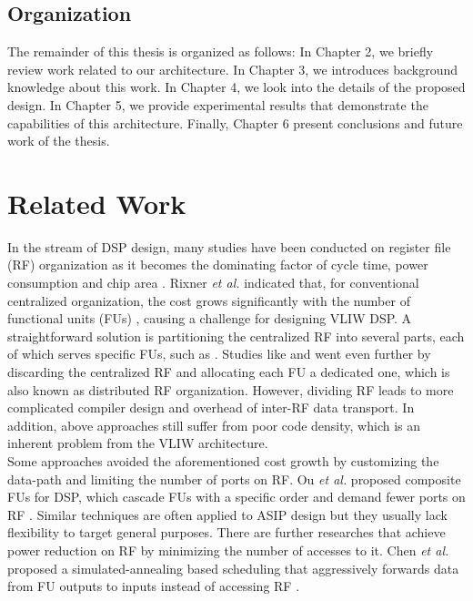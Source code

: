 \documentclass[12pt]{article}
\begin{document}
\begin{CJK}{UTF8}{bkai}
    \subsection{Organization}
        The remainder of this thesis is organized as follows: In Chapter 2, we briefly review work related to our architecture. In Chapter 3, we introduces background knowledge about this work. In Chapter 4, we look into the details of the proposed design. In Chapter 5, we provide experimental results that demonstrate the capabilities of this architecture. Finally, Chapter 6 present conclusions and future work of the thesis.

\newpage

\section{Related Work}
    In the stream of DSP design, many studies have been conducted on register file (RF) organization as it becomes the dominating factor of cycle time, power consumption and chip area \cite{register}.
    Rixner \textit{et al.} indicated that, for conventional centralized organization, the cost grows significantly with the number of functional units (FUs) \cite{register}, causing a challenge for designing VLIW DSP.
    A straightforward solution is partitioning the centralized RF into several parts, each of which serves specific FUs, such as \cite{cluster}.
    Studies like \cite{synzen} and \cite{dsplite} went even further by discarding the centralized RF and allocating each FU a dedicated one, which is also known as distributed RF organization.
    However, dividing RF leads to more complicated compiler design and overhead of inter-RF data transport.
    In addition, above approaches still suffer from poor code density, which is an inherent problem from the VLIW architecture.
    \\
    Some approaches avoided the aforementioned cost growth by customizing the data-path and limiting the number of ports on RF.
    Ou \textit{et al.} proposed composite FUs for DSP, which cascade FUs with a specific order and demand fewer ports on RF \cite{cascade} \cite{hearaid}.
    Similar techniques are often applied to ASIP design but they usually lack flexibility to target general purposes.
    There are further researches that achieve power reduction on RF by minimizing the number of accesses to it.
    Chen \textit{et al.} proposed a simulated-annealing based scheduling that aggressively forwards data from FU outputs to inputs instead of accessing RF \cite{multistage}.

\end{CJK}
\end{document}
